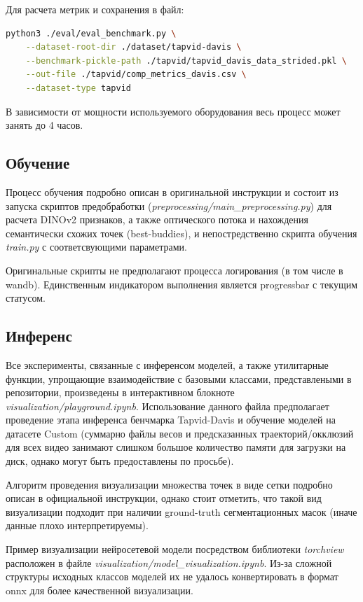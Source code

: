 \documentclass[a4paper, 14pt]{extarticle}
\theoremstyle{definition}
\theoremstyle{plain}
\theoremstyle{remark}
\begin{document}
Для расчета метрик и сохранения в файл:
\begin{lstlisting}[language=bash]
python3 ./eval/eval_benchmark.py \
    --dataset-root-dir ./dataset/tapvid-davis \
    --benchmark-pickle-path ./tapvid/tapvid_davis_data_strided.pkl \
    --out-file ./tapvid/comp_metrics_davis.csv \
    --dataset-type tapvid 
\end{lstlisting}

В зависимости от мощности используемого оборудования весь процесс может занять до 4 часов.

\subsection{Обучение}
Процесс обучения подробно описан в оригинальной инструкции и состоит из запуска скриптов предобработки (\textit{preprocessing/main\_preprocessing.py}) для расчета DINOv2 признаков, а также оптического потока и нахождения семантически схожих точек (best-buddies), и непостредственно скрипта обучения \textit{train.py} с соответсвующими параметрами.

Оригинальные скрипты не предполагают процесса логирования (в том числе в wandb). Единственным индикатором выполнения является progressbar с текущим статусом.

\subsection{Инференс}
Все эксперименты, связанные с инференсом моделей, а также утилитарные функции, упрощающие взаимодействие с базовыми классами, представлеными в репозитории, произведены в интерактивном блокноте \\ \textit{visualization/playground.ipynb}. Использование данного файла предполагает проведение этапа инференса бенчмарка Tapvid-Davis и обучение моделей на датасете Custom (суммарно файлы весов и предсказанных траекторий/окклюзий для всех видео занимают слишком большое количество памяти для загрузки на диск, однако могут быть предоставлены по просьбе).

Алгоритм проведения визуализации множества точек в виде сетки подробно описан в официальной инструкции, однако стоит отметить, что такой вид визуализации подходит при наличии ground-truth сегментационных масок (иначе данные плохо интерпретируемы).

Пример визуализации нейросетевой модели посредством библиотеки \textit{torchview} расположен в файле \textit{visualization/model\_visualization.ipynb}. Из-за сложной структуры исходных классов моделей их не удалось конвертировать в формат onnx для более качественной визуализации.
\end{document}
